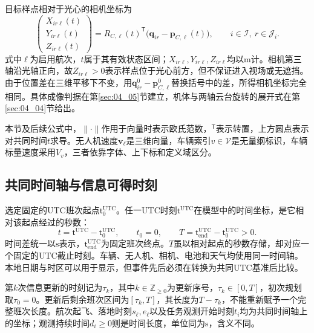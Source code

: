 目标样点相对于光心的相机坐标为
\begin{equation}
 \begin{pmatrix}X_{ir\ell}(t)\\Y_{ir\ell}(t)\\Z_{ir\ell}(t)\end{pmatrix}
 =R_{C,\ell}(t)^{\mathsf T}
 \bigl(\mathbf q_{ir}-\mathbf p_{C,\ell}(t)\bigr),
 \qquad i\in\mathcal I,\ r\in\mathcal J_i.
 \label{s0403:target_camera_coordinates}
\end{equation}
式中$\ell$为启用航次，$t$属于其有效状态区间；$X_{ir\ell},Y_{ir\ell},Z_{ir\ell}$均以$\mathrm m$计。相机第三轴沿光轴正向，故$Z_{ir\ell}>0$表示样点位于光心前方，但不保证进入视场或无遮挡。由于位置差在三维平移下不变，用$\mathbf q_{ir}^0-\mathbf p_{C,\ell}^0$替换括号中的差，所得相机坐标完全相同。具体成像判据在第\ref{sec:04_05}节建立，机体与两轴云台旋转的展开式在第\ref{sec:04_04}节给出。

本节及后续公式中，$\|\cdot\|$作用于向量时表示欧氏范数，$^{\mathsf T}$表示转置，上方圆点表示对共同时间$t$求导。无人机速度$\mathbf v_\ell$是三维向量，车辆索引$v\in\mathcal V$是无量纲标识，车辆标量速度采用$V_v$，三者依靠字体、上下标和定义域区分。

\subsection{共同时间轴与信息可得时刻}

选定固定的UTC班次起点$\mathsf t_0^{\mathrm{UTC}}$。任一UTC时刻$\mathsf t^{\mathrm{UTC}}$在模型中的时间坐标，是它相对该起点经过的秒数：
\begin{equation}
 t=\mathsf t^{\mathrm{UTC}}-\mathsf t_0^{\mathrm{UTC}},
 \qquad t_0=0,
 \qquad
 T=\mathsf t_{\mathrm{end}}^{\mathrm{UTC}}-\mathsf t_0^{\mathrm{UTC}}>0.
 \label{s0403:common_clock}
\end{equation}
时间差统一以$\mathrm s$表示，$\mathsf t_{\mathrm{end}}^{\mathrm{UTC}}$为固定班次终点。$T$虽以相对起点的秒数存储，却对应一个固定的UTC截止时刻。车辆、无人机、相机、电池和天气均使用同一时间轴。本地日期与时区可以用于显示，但事件先后必须在转换为共同UTC基准后比较。

第$k$次信息更新的时刻记为$\tau_k$，其中$k\in\mathbb Z_{\ge0}$为更新序号，$\tau_k\in[0,T]$，初次规划取$\tau_0=0$。更新后剩余班次区间为$[\tau_k,T]$，其长度为$T-\tau_k$，不能重新赋予一个完整班次长度。航次起飞、落地时刻$s_\ell,e_\ell$以及任务观测开始时刻$t_i$均为共同时间轴上的坐标；观测持续时间$d_i\ge0$则是时间长度，单位同为$\mathrm s$，含义不同。

